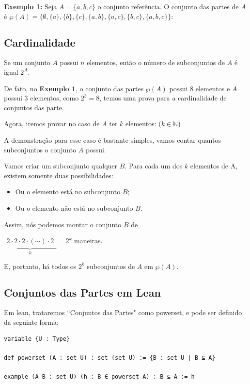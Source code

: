 \textbf{Exemplo 1:}  Seja $A = \{a,b,c\}$ o conjunto referência.
O conjunto das partes de $A$ é $\wp(A)
= \{\emptyset,\{a\},\{b\},\{c\},\{a,b\},\{a,c\},\{b,c\},\{a,b,c\}\}$: 

\subsection{Cardinalidade}
Se um conjunto $A$ possui $n$ elementos, então o número de subconjuntos de $A$ é igual $2^A$.

De fato, no \textbf{Exemplo 1}, o conjunto das partes $\wp(A)$ possui 8 elementos e $A$ possui 3 elementos, como $2^3 = 8$, temos uma prova para a cardinalidade de conjuntos das parte.

Agora, iremos provar no caso de $A$ ter $k$ elementos: ($k \in  \mathbb{N}$) 

A demonstração para esse caso é bastante simples, vamos contar quantos subconjuntos o conjunto $A$ possui.

Vamos criar um subconjunto qualquer $B$. Para cada um dos $k$ elementos de A, existem somente duas possibilidades:

\begin{itemize}

\item Ou o elemento está no subconjunto $B$;
    
\item Ou o elemento não está no subconjunto $B$.
  
\end{itemize}

Assim, nós podemos montar o conjunto $B$ de
\begin{center}
    $\underbrace{\begin{matrix} 2\cdot2\cdot2\cdot(\cdots)\cdot2\end{matrix}}_{k} = 2^k$ maneiras.
\end{center}
E, portanto, há todos os $2^k$ subconjuntos de $A$ em $\wp(A)$.

\subsection{Conjuntos das Partes em Lean}
Em lean, trataremos ``Conjuntos das Partes"  como {\selectfont powerset}, e pode ser definido da seguinte forma:
\begin{lstlisting}
variable {U : Type}

def powerset (A : set U) : set (set U) := {B : set U | B ⊆ A}

example (A B : set U) (h : B ∈ powerset A) : B ⊆ A := h \end{lstlisting}

